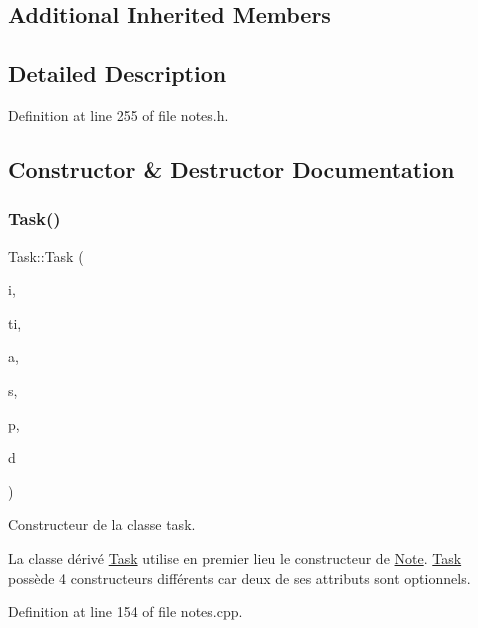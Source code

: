\subsection*{Additional Inherited Members}


\subsection{Detailed Description}


Definition at line 255 of file notes.\+h.



\subsection{Constructor \& Destructor Documentation}
\mbox{\label{class_task_a08a0f57803d8ef35f687f23f759e9f0c}} 
\subsubsection{\texorpdfstring{Task()}{Task()}}
{\footnotesize\ttfamily Task\+::\+Task (\begin{DoxyParamCaption}\item[{const Q\+String \&}]{i,  }\item[{const Q\+String \&}]{ti,  }\item[{const Q\+String \&}]{a,  }\item[{E\+N\+U\+M\+::\+Status\+Type}]{s,  }\item[{unsigned int}]{p,  }\item[{const Q\+Date\+Time}]{d }\end{DoxyParamCaption})}



Constructeur de la classe task. 

La classe dérivé \hyperlink{class_task}{Task} utilise en premier lieu le constructeur de \hyperlink{class_note}{Note}. \hyperlink{class_task}{Task} possède 4 constructeurs différents car deux de ses attributs sont optionnels. 

Definition at line 154 of file notes.\+cpp.

